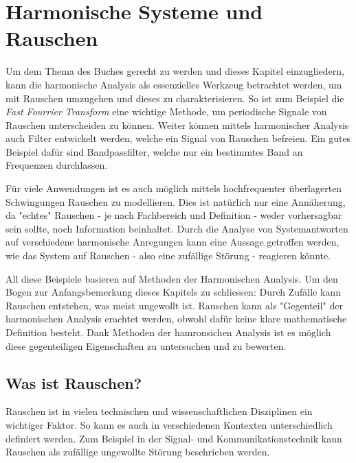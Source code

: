 %
%
%
%


\section{Harmonische Systeme und Rauschen\label{brown:Rauschen}}

Um dem Thema des Buches gerecht zu werden und dieses Kapitel einzugliedern, kann die harmonische Analysis als essenzielles Werkzeug betrachtet werden, um mit Rauschen umzugehen und dieses zu charakterisieren. 
So ist zum Beispiel die \textit{Fast Fourrier Transform} eine wichtige Methode, um periodische Signale von Rauschen unterscheiden zu können. 
Weiter können mittels harmonischer Analysis auch Filter entwickelt werden, welche ein Signal von Rauschen befreien. Ein gutes Beispiel dafür sind Bandpassfilter, welche nur ein bestimmtes Band an Frequenzen durchlassen.


Für viele Anwendungen ist es auch möglich mittels hochfrequenter überlagerten Schwingungen Rauschen zu modellieren. Dies ist natürlich nur eine Annäherung, da "echtes" Rauschen - je nach Fachbereich und Definition - weder vorhersagbar sein sollte, noch Information beinhaltet. 
Durch die Analyse von Systemantworten auf verschiedene harmonische Anregungen kann eine Aussage getroffen werden, wie das System auf Rauschen - also eine zufällige Störung - reagieren könnte.


All diese Beispiele basieren auf Methoden der Harmonischen Analysis. Um den Bogen zur Anfangsbemerkung dieses Kapitels zu schliessen: Durch Zufälle kann Rauschen entstehen, was meist ungewollt ist. Rauschen kann als "Gegenteil" der harmonischen Analysis erachtet werden, obwohl dafür keine klare mathematische Definition besteht. Dank Methoden der hamronsichen Analysis ist es möglich diese gegenteiligen Eigenschaften zu untersuchen und zu bewerten.


\subsection{Was ist Rauschen?\label{brown:Rauschen:Arten}}
Rauschen ist in vielen technischen und wissenschaftlichen Disziplinen ein wichtiger Faktor. So kann es auch in verschiedenen Kontexten unterschiedlich definiert werden. Zum Beispiel in der Signal- und Kommunikationstechnik kann Rauschen als zufällige ungewollte Störung beschrieben werden. 


